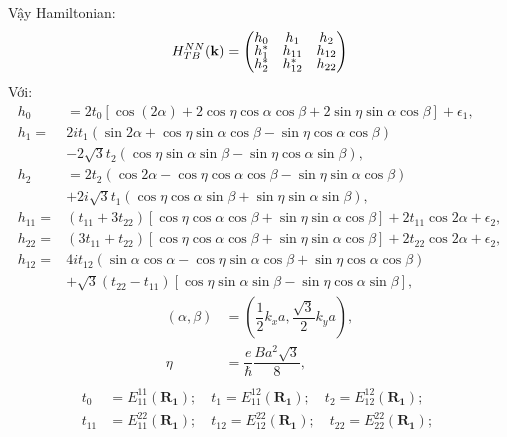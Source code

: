 \documentclass{article}
\begin{document}
\clearpage
Vậy Hamiltonian:
\begin{align}
	H_{TB}^{NN}(\mathbf{k}) =
	\begin{pmatrix}
		\renewcommand{\arraystretch}{0.72}
		h_0   & h_1      & h_2    \\
		h_1^* & h_{11}   & h_{12} \\
		h_2^* & h_{12}^* & h_{22}
	\end{pmatrix}
\end{align}\label{eq:1}
Với:
\begin{align}
	h_0      & = 2 t_0 \left[ \cos (2\alpha) + 2\cos\eta \cos\alpha\cos\beta + 2\sin\eta\sin\alpha\cos\beta\right] +   \epsilon_1,             \\
	h_1=     & 2 i t_1 (\sin 2\alpha + \cos\eta\sin\alpha\cos\beta -    \sin\eta\cos\alpha\cos\beta )       \nonumber                          \\
	         & - 2\sqrt{3}t_2\left( \cos\eta\sin\alpha\sin\beta - \sin\eta\cos\alpha\sin\beta  \right),                                        \\
	h_2      & = 2t_2 (\cos 2\alpha - \cos\eta\cos\alpha\cos\beta - \sin\eta\sin\alpha\cos\beta)                                               \\
	         & + 2i\sqrt{3}t_1(\cos\eta\cos\alpha\sin\beta +  \sin\eta\sin\alpha\sin\beta),                                                    \\
	h_{11}=  & (t_{11} + 3t_{22}) \left[ \cos\eta\cos\alpha\cos\beta + \sin\eta\sin\alpha\cos\beta \right] + 2t_{11}\cos2\alpha + \epsilon_2 , \\
	h_{22}=  & (3t_{11} + t_{22}) \left[ \cos\eta\cos\alpha\cos\beta + \sin\eta\sin\alpha\cos\beta \right] + 2t_{22}\cos2\alpha + \epsilon_2,  \\
	h_{12} = & 4it_{12}(\sin\alpha\cos\alpha -\cos\eta\sin\alpha\cos\beta + \sin\eta\cos\alpha\cos\beta ) \nonumber                            \\
	         & + \sqrt{3} (t_{22} - t_{11})\left[ \cos\eta\sin\alpha\sin\beta - \sin\eta\cos\alpha\sin\beta \right],
\end{align}
\begin{equation}
	\begin{split}
		(\alpha,\beta) & = \left(\dfrac{1}{2} k_x a,\dfrac{\sqrt{3}}{2} k_y a \right), \\
		\eta           & = \dfrac{e}{\hbar}\dfrac{Ba^2\sqrt{3}}{8},                    \\
	\end{split}
\end{equation}
\begin{equation}
	\begin{split}
		t_0    & = E_{11}^{11}(\mathbf{R_1}); \quad t_1 = E_{11}^{12}(\mathbf{R_1}); \quad t_2 = E_{12}^{12}(\mathbf{R_1}); \quad \\
		t_{11} & = E_{11}^{22}(\mathbf{R_1}); \quad t_{12} = E_{12}^{22}(\mathbf{R_1}); \quad t_{22} = E_{22}^{22}(\mathbf{R_1});
	\end{split}
\end{equation}
\end{document}
